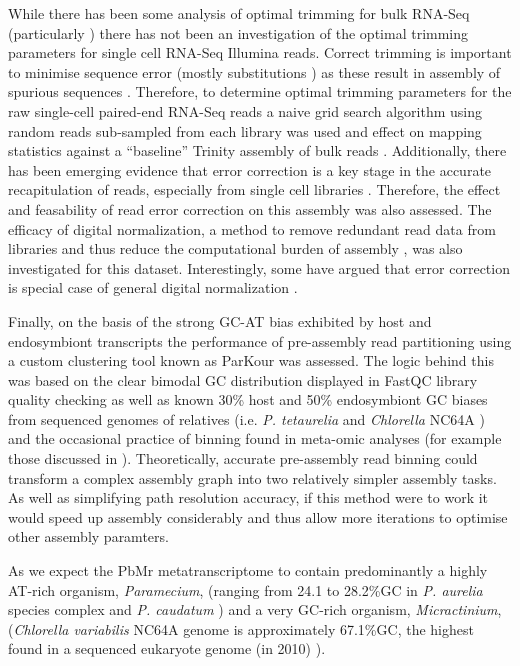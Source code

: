 While there has been some analysis of optimal trimming for bulk RNA-Seq (particularly \citep{MacManes2014})
there has not been an investigation of the optimal trimming parameters for single cell RNA-Seq Illumina reads.
Correct trimming is important to minimise sequence error (mostly substitutions \citep{Yang2013}) as these
result in assembly of spurious sequences \citep{Macmanes2013,MacManes2014}.  Therefore, to determine
optimal trimming parameters for the raw single-cell paired-end RNA-Seq reads 
a naive grid search algorithm using random reads sub-sampled from each library was used and effect on mapping
statistics against a ``baseline'' Trinity assembly of bulk reads \citep{Haas2013}.
Additionally, there has been emerging evidence that error correction is a key stage in the accurate
recapitulation of reads, especially from single cell libraries \citep{Medvedev2011}.  Therefore, the effect and feasability 
of read error correction on this assembly was also assessed.  
The efficacy of digital normalization, a method to remove redundant read data from libraries and thus
reduce the computational burden of assembly \citep{Brown2012}, was also investigated for this dataset.
Interestingly, some have argued that error correction is special case of general digital normalization
\citep{Krasileva2013}.


Finally, on the basis of the strong GC-AT bias exhibited by host and endosymbiont transcripts
the performance of pre-assembly read partitioning using a custom clustering tool known as
ParKour was assessed.  The logic behind this was based on the clear bimodal GC distribution
displayed in FastQC library quality checking as well as known 30\% host and 50\% endosymbiont
GC biases from sequenced genomes of relatives (i.e. \textit{P. tetaurelia} \citep{Aury2006} and 
\textit{Chlorella} NC64A \citep{Blanc2010a}) and the occasional practice of binning found in
meta-omic analyses (for example those discussed in \citep{Droge2012}).  Theoretically, accurate
pre-assembly read binning could transform a complex assembly graph into two relatively simpler
assembly tasks.  As well as simplifying path resolution accuracy, if this method were to work
it would speed up assembly considerably and thus allow more iterations to optimise other
assembly paramters.

As we expect the PbMr metatranscriptome to contain predominantly a highly AT-rich organism, \textit{Paramecium},
(ranging from 24.1 to 28.2\%GC in \textit{P. aurelia} species complex and \textit{P. caudatum} \citep{Aury2006,McGrath2014})
and a very GC-rich organism, \textit{Micractinium}, (\textit{Chlorella variabilis} NC64A genome is approximately 67.1\%GC, the highest
found in a sequenced eukaryote genome (in 2010) \citep{Blanc2010}).  



